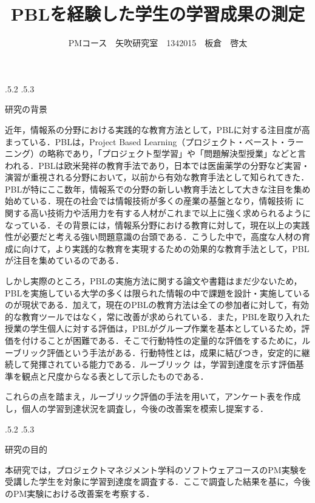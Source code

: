 \documentclass[uplatex]{jsarticle}
\title{\vspace{-14mm}PBLを経験した学生の学習成果の測定}
\author{PMコース　矢吹研究室　1342015　板倉　啓太}
\date{}%
\makeatletter
\renewcommand{\section}{%
    \if@slide\clearpage\fi
    \@startsection{section}{1}{\z@}%
    {\Cvs \@plus.5\Cdp \@minus.2\Cdp}%
    {.5\Cvs \@plus.3\Cdp}%
    {\normalfont\raggedright}}
\makeatother
\begin{document}
\maketitle





\section{研究の背景}

近年，情報系の分野における実践的な教育方法として，PBLに対する注目度が高まっている\cite{PBL}\cite{PBL1}．PBLは，Project Based Learning（プロジェクト・ベースト・ラーニング）の略称であり，「プロジェクト型学習」や「問題解決型授業」などと言われる．PBLは欧米発祥の教育手法であり，日本では医歯薬学の分野など実習・演習が重視される分野において，以前から有効な教育手法として知られてきた．PBLが特にここ数年，情報系での分野の新しい教育手法として大きな注目を集め始めている．現在の社会では情報技術が多くの産業の基盤となり，情報技術 に関する高い技術力や活用力を有する人材がこれまで以上に強く求められるようになっている．その背景には，情報系分野における教育に対して，現在以上の実践性が必要だと考える強い問題意識の台頭である．こうした中で，高度な人材の育成に向けて，より実践的な教育を実現するための効果的な教育手法として，PBLが注目を集めているのである．

しかし実際のところ，PBLの実施方法に関する論文や書籍はまだ少ないため，PBLを実施している大学の多くは限られた情報の中で課題を設計・実施しているのが現状である．加えて，現在のPBLの教育方法は全ての参加者に対して，有効的な教育ツールではなく，常に改善が求められている．また，PBLを取り入れた授業の学生個人に対する評価は，PBLがグループ作業を基本としているため，評価を付けることが困難である．そこで行動特性の定量的な評価をするために，ルーブリック評価という手法がある\cite{ルーブリック評価}．行動特性とは，成果に結びつき，安定的に継続して発揮されている能力である．ルーブリック は，学習到達度を示す評価基準を観点と尺度からなる表として示したものである．

これらの点を踏まえ，ルーブリック評価の手法を用いて，アンケート表を作成し，個人の学習到達状況を調査し，今後の改善案を模索し提案する．




\section{研究の目的}

本研究では，プロジェクトマネジメント学科のソフトウェアコースのPM実験を受講した学生を対象に学習到達度を調査する．ここで調査した結果を基に，今後のPM実験における改善案を考察する．
\end{document}

